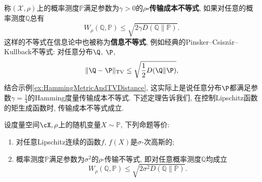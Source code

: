 称$(\mathcal{X}, \rho)$上的概率测度$\mathbb{P}$满足参数为$\gamma > 0$的\textbf{$\rho$-传输成本不等式}, 如果对任意的概率测度$\mathbb{Q}$总有
 \begin{equation}\label{eq:TransportationCostInequality}
 	W_{\rho} (\mathbb{Q}, \mathbb{P}) \leq \sqrt{2 \gamma D(\mathbb{Q} \| \mathbb{P})}.
 \end{equation}
 这样的不等式在信息论中也被称为\textbf{信息不等式}, 例如经典的Pinsker–Csiszár–Kullback不等式: 对任意分布$\Q$, $\P$, 
 \begin{equation}\label{eq:Pinsker–Csiszár–Kullback}
 	\|\Q - \P\|_{\text{TV}} \leq \sqrt{\frac{1}{2}D(\Q\|\P)}, 
 \end{equation}
 结合示例\ref{ex:HammingMetricAndTVDistance}, 这实际上是说任意分布$\P$都满足参数$\gamma = \frac{1}{4}$的Hamming度量传输成本不等式. 
下述定理告诉我们, 在控制Lipschitz函数的矩生成函数时, 传输成本不等式成立. 

\begin{theorem}\label{thm:Bobkov-Götze}
	设度量空间$\cX, \rho$上的随机变量$X \sim \mathbb{P}$, 下列命题等价: 
	\begin{enumerate}
		\item 对任意Lipschitz连续的函数$f$, $f(X)$是$\sigma$-次高斯的;
		\item 概率测度$\mathbb{P}$满足参数为$\sigma^2$的$\rho$-传输不等式, 即对任意概率测度$\mathbb{Q}$均成立
			\begin{equation*}
				W_{\rho}(\mathbb{Q}, \mathbb{P}) \leq \sqrt{2 \sigma^2 D(\mathbb{Q} \| \mathbb{P})}. 
			\end{equation*}
	\end{enumerate}
\end{theorem}

